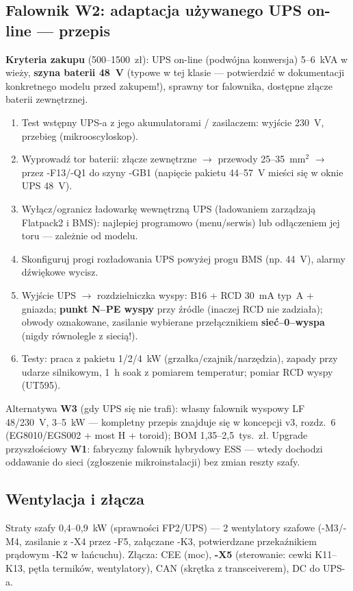 \documentclass[11pt,a4paper]{article}
\begin{document}
\subsection{Falownik W2: adaptacja używanego UPS on-line --- przepis}
\label{sec:ups}
\textbf{Kryteria zakupu} (500--1500~zł): UPS on-line (podwójna konwersja) 5--6~kVA w wieży,
\textbf{szyna baterii 48~V} (typowe w tej klasie --- potwierdzić w dokumentacji konkretnego
modelu przed zakupem!), sprawny tor falownika, dostępne złącze baterii zewnętrznej.
\begin{enumerate}
\item Test wstępny UPS-a z jego akumulatorami / zasilaczem: wyjście 230~V, przebieg (mikrooscyloskop).
\item Wyprowadź tor baterii: złącze zewnętrzne $\to$ przewody 25--35~mm$^2$ $\to$ przez -F13/-Q1
do szyny -GB1 (napięcie pakietu 44--57~V mieści się w oknie UPS 48~V).
\item Wyłącz/ogranicz ładowarkę wewnętrzną UPS (ładowaniem zarządzają Flatpack2 i BMS): najlepiej
programowo (menu/serwis) lub odłączeniem jej toru --- zależnie od modelu.
\item Skonfiguruj progi rozładowania UPS powyżej progu BMS (np. 44~V), alarmy dźwiękowe wycisz.
\item Wyjście UPS $\to$ rozdzielniczka wyspy: B16 + RCD 30~mA typ~A + gniazda; \textbf{punkt N--PE
wyspy} przy źródle (inaczej RCD nie zadziała); obwody oznakowane, zasilanie wybierane
przełącznikiem \textbf{sieć--0--wyspa} (nigdy równolegle z siecią!).
\item Testy: praca z pakietu 1/2/4~kW (grzałka/czajnik/narzędzia), zapady przy udarze silnikowym,
1~h soak z pomiarem temperatur; pomiar RCD wyspy (UT595).
\end{enumerate}
Alternatywa \textbf{W3} (gdy UPS się nie trafi): własny falownik wyspowy LF 48/230~V, 3--5~kW ---
kompletny przepis znajduje się w koncepcji v3, rozdz.~6 (EG8010/EGS002 + most H + toroid);
BOM 1,35--2,5~tys.~zł. Upgrade przyszłościowy \textbf{W1}: fabryczny falownik hybrydowy ESS ---
wtedy dochodzi oddawanie do sieci (zgłoszenie mikroinstalacji) bez zmian reszty szafy.
\subsection{Wentylacja i złącza}
Straty szafy 0,4--0,9~kW (sprawności FP2/UPS) --- 2 wentylatory szafowe (-M3/-M4, zasilanie z -X4
przez -F5, załączane -K3, potwierdzane przekaźnikiem prądowym -K2 w łańcuchu). Złącza: CEE (moc),
\textbf{-X5} (sterowanie: cewki K11--K13, pętla termików, wentylatory), CAN (skrętka z transceiverem),
DC do UPS-a.
\end{document}
